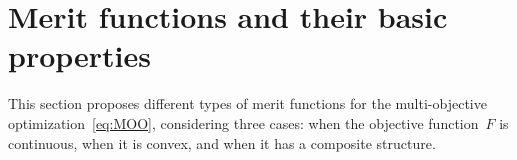 \documentclass[../../main]{subfiles}
\begin{document}
\section{Merit functions and their basic properties} \label{sec:merit:merit}
This section proposes different types of merit functions for the multi-objective optimization~\cref{eq:MOO}, considering three cases: when the objective function~$F$ is continuous, when it is convex, and when it has a composite structure.






\end{document}
